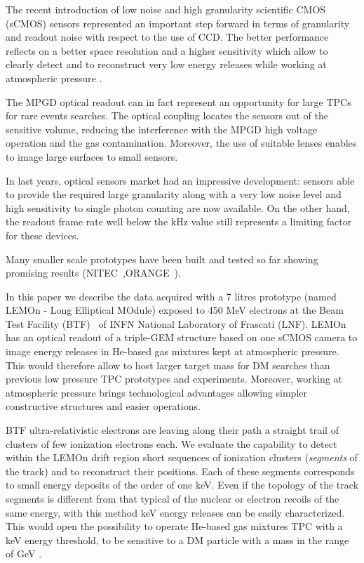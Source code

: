 \documentclass[review]{elsarticle}
\begin{document}
  The recent introduction of
  low noise and high granularity scientific CMOS (sCMOS) sensors represented an important step forward in terms of granularity and readout noise with respect to the use of CCD. The better performance reflects on a better space resolution and a higher sensitivity which allow to clearly detect and to reconstruct very low energy releases while working at atmospheric pressure \cite{bib:jinst_orange1, bib:nim_orange2}.

The MPGD optical readout can in fact  represent an opportunity for large TPCs for rare events searches. The optical coupling locates  the sensors out of the sensitive volume, reducing the interference with the  MPGD high
voltage operation and  the gas contamination.
Moreover, the use of suitable lenses enables to image   large surfaces to small sensors.

In last years, optical sensors market had an impressive development: sensors able to provide the required large granularity along with a very low noise level and high sensitivity to single photon counting are now available.
On the other hand, the readout frame rate well below the kHz value still represents a limiting factor for these devices. 

Many smaller scale prototypes have been built and tested so far showing promising results (NITEC~\cite{JINST:nitec},ORANGE~\cite{NIM:Marafinietal, bib:jinst_orange2}).

   In this paper we describe the  data acquired  with a  7 litres prototype (named LEMOn -  Long Elliptical MOdule) exposed to 450 MeV electrons at the Beam Test Facility (BTF)~\cite{bib:btf} of INFN National Laboratory of Frascati (LNF).
    LEMOn has   an optical readout of a triple-GEM structure  based on one sCMOS camera  to image  energy releases in  He-based gas mixtures  kept  at atmospheric pressure. This would therefore allow to host larger target mass for DM searches than previous low pressure TPC prototypes and experiments.  Moreover, working at atmospheric pressure brings technological advantages allowing simpler constructive structures and
    easier operations.
    
    BTF ultra-relativistic electrons   are  leaving along their path a straight trail of  clusters of few ionization electrons each.  We  evaluate the capability  to detect within the LEMOn drift region short sequences of ionization clusters  ({\it segments }  of the track)  and to reconstruct  their  positions. Each of these segments  corresponds to   small energy deposits of the order of one keV. Even if the topology of the track segments is different from that   typical of the nuclear or electron recoils of the same energy, with this method keV energy releases can be easily characterized. This would open the possibility to operate He-based gas mixtures TPC with a keV  energy threshold, to be sensitive to a DM particle with a mass in the range of GeV \cite{Pinci:2019hhw}.
    
\end{document}
